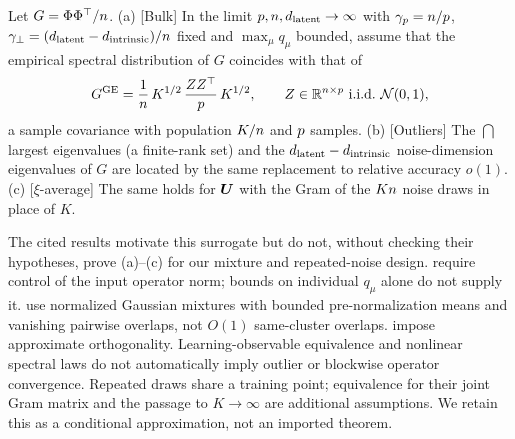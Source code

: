 \begin{assumption}\label{ass:fourbulk-ge}
Let $G=\Phi\Phi^\top/n$. (a) [Bulk] In the limit $p,n,d_{\mathrm{latent}}\to\infty$ with $\gamma_p=n/p$, $\gamma_\perp=(d_{\mathrm{latent}}-d_{\mathrm{intrinsic}})/n$ fixed and $\max_\mu q_\mu$ bounded, assume that the empirical spectral distribution of $G$ coincides with that of
\begin{equation}\label{eq:fourbulk-GE}
  G^{\mathrm{GE}}=\frac{1}{n}\,K^{1/2}\,\frac{ZZ^\top}{p}\,K^{1/2},\qquad Z\in\mathbb{R}^{n\times p}\ \text{i.i.d.}\ \mathcal N(0,1),
\end{equation}
a sample covariance with population $K/n$ and $p$ samples. (b) [Outliers] The $\dint$ largest eigenvalues (a finite-rank set) and the $d_{\mathrm{latent}}-d_{\mathrm{intrinsic}}$ noise-dimension eigenvalues of $G$ are located by the same replacement to relative accuracy $o(1)$. (c) [$\xi$-average] The same holds for $\bm{U}$ with the Gram of the $Kn$ noise draws in place of $K$.
\end{assumption}
The cited results motivate this surrogate but do not, without checking their hypotheses, prove (a)--(c) for our mixture and repeated-noise design. \citet{louart2018random} require control of the input operator norm; bounds on individual $q_\mu$ alone do not supply it. \citet{liao2018spectrum} use normalized Gaussian mixtures with bounded pre-normalization means and vanishing pairwise overlaps, not $O(1)$ same-cluster overlaps. \citet{fanwang2020spectra} impose approximate orthogonality. Learning-observable equivalence \citep{goldt2022gaussian,hu2022universality,mei2022generalization} and nonlinear spectral laws \citep{pennington2017nonlinear,benigni2021eigenvalue} do not automatically imply outlier or blockwise operator convergence. Repeated draws share a training point; equivalence for their joint Gram matrix and the passage to $K\to\infty$ are additional assumptions. We retain this as a conditional approximation, not an imported theorem.

